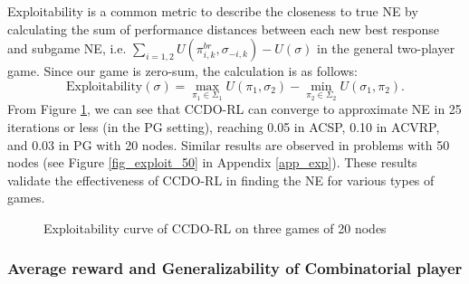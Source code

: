 Exploitability is a common metric to describe the closeness to true NE by calculating the sum of performance distances between each new best response and subgame NE, i.e. $\sum_{i=1,2} U(\pi_{i,k}^{br}, \sigma_{-i,k}) - U(\sigma)$ in the general two-player game. Since our game is zero-sum, the calculation is as follows:
\begin{equation*}
   \text{Exploitability}(\sigma) = \max_{\pi_1 \in \Sigma_1} U(\pi_1, \sigma_{2}) - \min_{\pi_2 \in \Sigma_2} U(\sigma_1, \pi_2).
\end{equation*}
From Figure \ref{fig_exploit_20}, we can see that CCDO-RL can converge to approximate NE in 25 iterations or less (in the PG setting), reaching 0.05 in ACSP, 0.10 in ACVRP, and 0.03 in PG with 20 nodes. Similar results are observed in problems with 50 nodes (see Figure \ref{fig_exploit_50} in Appendix \ref{app_exp}). These results validate the effectiveness of CCDO-RL in finding the NE for various types of games.

\vspace{-\baselineskip}
\begin{figure}[htbp]
	\centering
    \caption{Exploitability curve of CCDO-RL on three games of 20 nodes}
    \label{fig_exploit_20}
\end{figure}
\vspace{-\baselineskip}
\subsubsection{Average reward and Generalizability of Combinatorial player} \label{sub_per_rob}


